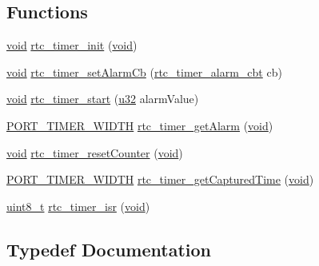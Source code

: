 \subsection*{Functions}
\begin{DoxyCompactItemize}
\item 
\hyperlink{usb__devapi_8h_afabf60e7f57651d6d595a02c75f07cd0}{void} \hyperlink{iot-lab___m3_2rtc__timer_8h_ab3506e4fdd605af503d5b02e24049336}{rtc\+\_\+timer\+\_\+init} (\hyperlink{usb__devapi_8h_afabf60e7f57651d6d595a02c75f07cd0}{void})
\item 
\hyperlink{usb__devapi_8h_afabf60e7f57651d6d595a02c75f07cd0}{void} \hyperlink{iot-lab___m3_2rtc__timer_8h_a76ad10e60d7fd22eedc47abfb9099501}{rtc\+\_\+timer\+\_\+set\+Alarm\+Cb} (\hyperlink{openmotestm_2rtc__timer_8h_ae333b9179d396f03c9fc63b5692bc33a}{rtc\+\_\+timer\+\_\+alarm\+\_\+cbt} cb)
\item 
\hyperlink{usb__devapi_8h_afabf60e7f57651d6d595a02c75f07cd0}{void} \hyperlink{iot-lab___m3_2rtc__timer_8h_a016c61490a05f2bb2ab2f09a56cd5df0}{rtc\+\_\+timer\+\_\+start} (\hyperlink{agilefox_2library_2inc_2stm32f10x__type_8h_a2caf5cd7bcdbe1eefa727f44ffb10bac}{u32} alarm\+Value)
\item 
\hyperlink{z1_2board__info_8h_abe66b9c1c60db84f2a99f2b827275f24}{P\+O\+R\+T\+\_\+\+T\+I\+M\+E\+R\+\_\+\+W\+I\+D\+TH} \hyperlink{iot-lab___m3_2rtc__timer_8h_aa535123fefb4e057294fe97b8a7b0428}{rtc\+\_\+timer\+\_\+get\+Alarm} (\hyperlink{usb__devapi_8h_afabf60e7f57651d6d595a02c75f07cd0}{void})
\item 
\hyperlink{usb__devapi_8h_afabf60e7f57651d6d595a02c75f07cd0}{void} \hyperlink{iot-lab___m3_2rtc__timer_8h_a35ff8c653b9f6f7d3a778dc96426a18f}{rtc\+\_\+timer\+\_\+reset\+Counter} (\hyperlink{usb__devapi_8h_afabf60e7f57651d6d595a02c75f07cd0}{void})
\item 
\hyperlink{z1_2board__info_8h_abe66b9c1c60db84f2a99f2b827275f24}{P\+O\+R\+T\+\_\+\+T\+I\+M\+E\+R\+\_\+\+W\+I\+D\+TH} \hyperlink{iot-lab___m3_2rtc__timer_8h_a7a7f9bc5c49caefcd735852957228d91}{rtc\+\_\+timer\+\_\+get\+Captured\+Time} (\hyperlink{usb__devapi_8h_afabf60e7f57651d6d595a02c75f07cd0}{void})
\item 
\hyperlink{_p_e___types_8h_aba7bc1797add20fe3efdf37ced1182c5}{uint8\+\_\+t} \hyperlink{iot-lab___m3_2rtc__timer_8h_a0740af4c3e47f2bdf233e4798eda203e}{rtc\+\_\+timer\+\_\+isr} (\hyperlink{usb__devapi_8h_afabf60e7f57651d6d595a02c75f07cd0}{void})
\end{DoxyCompactItemize}


\subsection{Typedef Documentation}
